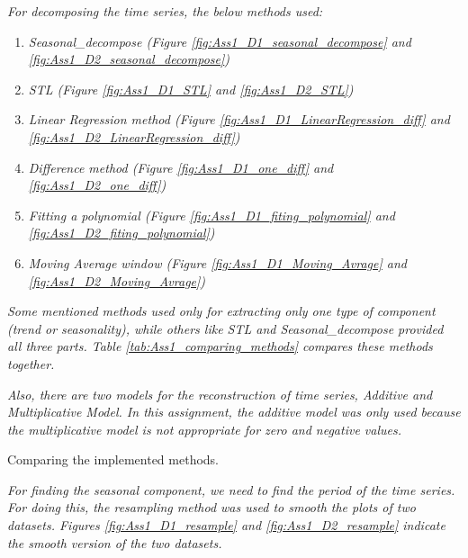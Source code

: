\textit{For decomposing the time series, the below methods used:}
    \begin{enumerate}
    \item \textit{Seasonal\_decompose (Figure
        \ref{fig:Ass1_D1_seasonal_decompose} and \ref{fig:Ass1_D2_seasonal_decompose})}
        
    \item \textit{STL (Figure
        \ref{fig:Ass1_D1_STL} and \ref{fig:Ass1_D2_STL})}
        
    \item \textit{Linear Regression method (Figure
        \ref{fig:Ass1_D1_LinearRegression_diff} and \ref{fig:Ass1_D2_LinearRegression_diff})}
        
    \item \textit{Difference method (Figure
        \ref{fig:Ass1_D1_one_diff} and \ref{fig:Ass1_D2_one_diff})}
        
    \item \textit{Fitting a polynomial (Figure
        \ref{fig:Ass1_D1_fiting_polynomial} and \ref{fig:Ass1_D2_fiting_polynomial})}
        
    \item \textit{Moving Average window (Figure
        \ref{fig:Ass1_D1_Moving_Avrage} and \ref{fig:Ass1_D2_Moving_Avrage})}

    \end{enumerate}

\textit{\newline \newline Some mentioned methods used only for extracting only one type of component (trend or seasonality), while others like STL 
and Seasonal\_decompose provided all three parts. Table \ref{tab:Ass1_comparing_methods} compares these methods together.}

\textit{Also, there are two models for the reconstruction of time series, Additive and Multiplicative Model. In this assignment, the additive model was only used because the multiplicative model is not appropriate for zero and negative values.}

\begin{table}[H]
\centering
\caption{Comparing the implemented methods.}
\label{tab:Ass1_comparing_methods}

\end{table}


\textit{For finding the seasonal component, we need to find the period of the time series. For doing this, the resampling method was used to smooth the plots of two datasets. Figures \ref{fig:Ass1_D1_resample} and \ref{fig:Ass1_D2_resample} indicate the smooth version of the two datasets. }

